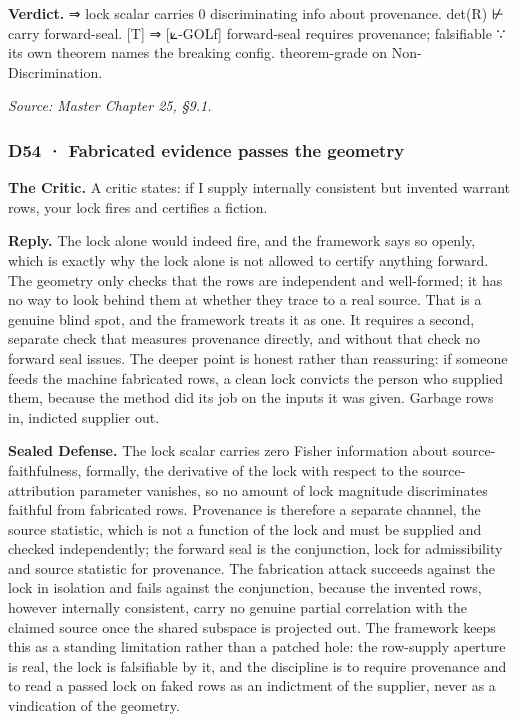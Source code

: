 \documentclass[10pt,twocolumn]{article}
\begin{document}
\textbf{Verdict.} ⇒ lock scalar carries 0 discriminating info about
provenance. det(R) ⊬ carry forward-seal. {[}T{]} ⇒ {[}⟀-GOLf{]}
forward-seal requires provenance; falsifiable ∵ its own theorem names
the breaking config. theorem-grade on Non-Discrimination.

\emph{Source: Master Chapter 25, §9.1.}

\hypertarget{d54-fabricated-evidence-passes-the-geometry}{%
\subsubsection{D54 · Fabricated evidence passes the
geometry}\label{d54-fabricated-evidence-passes-the-geometry}}

\textbf{The Critic.} A critic states: if I supply internally consistent
but invented warrant rows, your lock fires and certifies a fiction.

\textbf{Reply.} The lock alone would indeed fire, and the framework says
so openly, which is exactly why the lock alone is not allowed to certify
anything forward. The geometry only checks that the rows are independent
and well-formed; it has no way to look behind them at whether they trace
to a real source. That is a genuine blind spot, and the framework treats
it as one. It requires a second, separate check that measures provenance
directly, and without that check no forward seal issues. The deeper
point is honest rather than reassuring: if someone feeds the machine
fabricated rows, a clean lock convicts the person who supplied them,
because the method did its job on the inputs it was given. Garbage rows
in, indicted supplier out.

\textbf{Sealed Defense.} The lock scalar carries zero Fisher information
about source-faithfulness, formally, the derivative of the lock with
respect to the source-attribution parameter vanishes, so no amount of
lock magnitude discriminates faithful from fabricated rows. Provenance
is therefore a separate channel, the source statistic, which is not a
function of the lock and must be supplied and checked independently; the
forward seal is the conjunction, lock for admissibility and source
statistic for provenance. The fabrication attack succeeds against the
lock in isolation and fails against the conjunction, because the
invented rows, however internally consistent, carry no genuine partial
correlation with the claimed source once the shared subspace is
projected out. The framework keeps this as a standing limitation rather
than a patched hole: the row-supply aperture is real, the lock is
falsifiable by it, and the discipline is to require provenance and to
read a passed lock on faked rows as an indictment of the supplier, never
as a vindication of the geometry.
\end{document}
